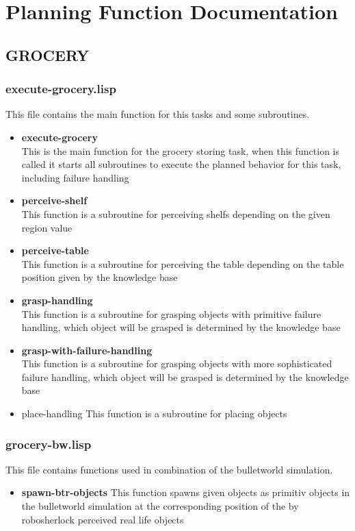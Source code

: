 \documentclass[main.tex]{subfiles}
\begin{document}
	\begingroup

	\renewcommand{\cleardoublepage}{}

	\renewcommand{\clearpage}{}

	\chapter{Planning Function Documentation}

		
		\section{GROCERY}
		
		\subsection{execute-grocery.lisp}
		This file contains the main function for this tasks and some subroutines.
		\begin{itemize}
			\item \textbf{execute-grocery} \\
			This is the main function for the grocery storing task, when this function is called it starts all subroutines to execute the planned behavior for this task, including failure handling
			\item \textbf{perceive-shelf} \\
			This function is a subroutine for perceiving shelfs depending on the given region value
			\item \textbf{perceive-table} \\
			This function is a subroutine for perceiving the table depending on the table position given by the knowledge base
			\item \textbf{grasp-handling} \\
			This function is a subroutine for grasping objects with primitive failure handling, which object will be grasped is determined by the knowledge base
			\item \textbf{grasp-with-failure-handling} \\
			This function is a subroutine for grasping objects with more sophisticated failure handling, which object will be grasped is determined by the knowledge base
			\item place-handling
			This function is a subroutine for placing objects
		\end{itemize}
		
		\subsection{grocery-bw.lisp}
		This file contains functions used in combination of the bulletworld simulation.
		\begin{itemize}
			\item \textbf{spawn-btr-objects}
			This function spawns given objects as primitiv objects in the bulletworld simulation at the corresponding position of the by robosherlock perceived real life objects 
		\end{itemize}
	  	
\end{document}
